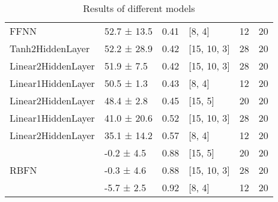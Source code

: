 \begin{table*}
\begin{tabular}{llrlrr}
 FFNN                         & 52.7 ± 13.5 &  0.41 & [8, 4]         &         12 &       20 \\
 Tanh2HiddenLayer             & 52.2 ± 28.9 &  0.42 & [15, 10, 3]    &         28 &       20 \\
 Linear2HiddenLayer           & 51.9 ± 7.5  &  0.42 & [15, 10, 3]    &         28 &       20 \\
 Linear1HiddenLayer           & 50.5 ± 1.3  &  0.43 & [8, 4]         &         12 &       20 \\
 Linear2HiddenLayer           & 48.4 ± 2.8  &  0.45 & [15, 5]        &         20 &       20 \\
 Linear1HiddenLayer           & 41.0 ± 20.6 &  0.52 & [15, 10, 3]    &         28 &       20 \\
 Linear2HiddenLayer           & 35.1 ± 14.2 &  0.57 & [8, 4]         &         12 &       20 \\
 \hline
\multirow{3}{*}{RBFN} & -0.2 ± 4.5  &  0.88 & [15, 5]        &         20 &       20 \\
                              & -0.3 ± 4.6  &  0.88 & [15, 10, 3]    &         28 &       20 \\
                              & -5.7 ± 2.5  &  0.92 & [8, 4]         &         12 &       20 \\
\hline
\end{tabular}
        \caption{Results of different models}
        \label{models}
    \end{table*}
    
